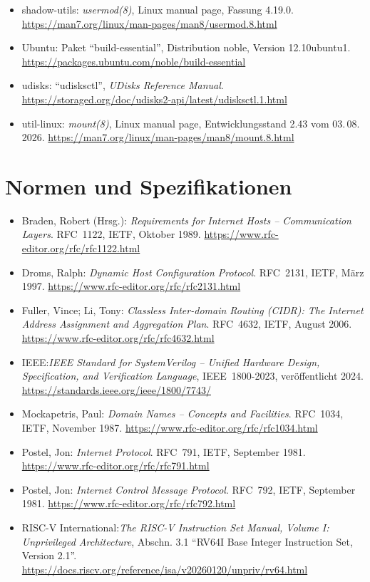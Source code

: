\begin{itemize}[nosep]
  \item shadow-utils: \emph{usermod(8)}, Linux manual page, Fassung 4.19.0. \url{https://man7.org/linux/man-pages/man8/usermod.8.html}
  \item Ubuntu: Paket \enquote{build-essential}, Distribution noble, Version 12.10ubuntu1. \url{https://packages.ubuntu.com/noble/build-essential}
  \item udisks: \enquote{udisksctl}, \emph{UDisks Reference Manual}. \url{https://storaged.org/doc/udisks2-api/latest/udisksctl.1.html}
  \item util-linux: \emph{mount(8)}, Linux manual page, Entwicklungsstand 2.43 vom 03.\,08.\,2026. \url{https://man7.org/linux/man-pages/man8/mount.8.html}
\end{itemize}

\section*{Normen und Spezifikationen}

\begin{itemize}[nosep]
  \item Braden, Robert (Hrsg.): \emph{Requirements for Internet Hosts -- Communication Layers}. RFC~1122, IETF, Oktober 1989. \url{https://www.rfc-editor.org/rfc/rfc1122.html}
  \item Droms, Ralph: \emph{Dynamic Host Configuration Protocol}. RFC~2131, IETF, März 1997. \url{https://www.rfc-editor.org/rfc/rfc2131.html}
  \item Fuller, Vince; Li, Tony: \emph{Classless Inter-domain Routing (CIDR): The Internet Address Assignment and Aggregation Plan}. RFC~4632, IETF, August 2006. \url{https://www.rfc-editor.org/rfc/rfc4632.html}
  \item IEEE:\emph{IEEE Standard for SystemVerilog -- Unified Hardware Design, Specification, and Verification Language}, IEEE~1800-2023, veröffentlicht 2024. \url{https://standards.ieee.org/ieee/1800/7743/}
  \item Mockapetris, Paul: \emph{Domain Names -- Concepts and Facilities}. RFC~1034, IETF, November 1987. \url{https://www.rfc-editor.org/rfc/rfc1034.html}
  \item Postel, Jon: \emph{Internet Protocol}. RFC~791, IETF, September 1981. \url{https://www.rfc-editor.org/rfc/rfc791.html}
  \item Postel, Jon: \emph{Internet Control Message Protocol}. RFC~792, IETF, September 1981. \url{https://www.rfc-editor.org/rfc/rfc792.html}
  \item RISC-V International:\emph{The RISC-V Instruction Set Manual, Volume I: Unprivileged Architecture}, Abschn. 3.1 \enquote{RV64I Base Integer Instruction Set, Version 2.1}. \url{https://docs.riscv.org/reference/isa/v20260120/unpriv/rv64.html}
\end{itemize}

